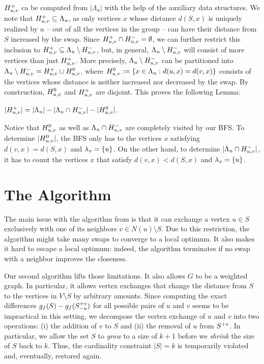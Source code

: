 $H_{u, v}^+$ ca be computed from $|\Lambda_u|$ with the help of the auxiliary data
structures. We note that $H_{u, v}^+ \subseteq \Lambda_u$, as only vertices $x$ whose
distance $d(S, x)$ is uniquely realized by $u$ -- out of all the vertices in
the group -- can have their distance from $S$ increased by the swap.
Since $H_{u, v}^+ \cap H_{u, v}^- = \emptyset$, we can further restrict this inclusion
to $H_{u, v}^+ \subseteq \Lambda_u \setminus H_{u, v}^-$, but, in general,
$\Lambda_u \setminus H_{u, v}^-$ will consist of more vertices than just $H_{u, v}^+$.
More precisely, $\Lambda_u \setminus H_{u, v}^-$ can be partitioned into
$\Lambda_u \setminus H_{u, v}^- = H_{u, v}^+ \cup H_{u, v}^0$, where
$\Huvo := \set{x \in \Lambda_u : d(u, x) = d(v, x)}$ consists of the vertices
whose distance is neither increased nor decreased by the swap. By construction,
$H_{u, v}^0$ and $H_{u, v}^+$ are disjoint. This proves the following Lemma:

\begin{lemma}
$|H_{u, v}^+| = |\Lambda_u| - |\Lambda_u \cap H_{u, v}^-| - |H_{u, v}^0|$.
\end{lemma}

Notice that $H_{u, v}^0$ as well as $\Lambda_u \cap H_{u, v}^-$ are completely
visited by our BFS. To determine $|H_{u, v}^0|$, the BFS only has to the vertices
$x$ satisfying $d(v, x) = d(S, x)$ and $\lambda_x = \set{u}$.
On the other hand, to determine $|\Lambda_u \cap H_{u, v}^-|$, it has to count the
vertices $x$ that satisfy $d(v, x) < d(S, x)$ and $\lambda_x = \set{u}$.


\section{The \growshrink Algorithm}
\label{sec:lsh-gc-grow-shrink}
%

The main issue with the \localswaps algorithm from 
is that it can exchange a vertex $u\in S$ exclusively with one of its neighbors
$v\in N(u) \setminus S$. Due to this restriction, the algorithm might take many
swaps to converge to a local optimum. It also makes it hard to escape a local
optimum: indeed, the algorithm terminates if no swap with a neighbor improves
the closeness.

Our second algorithm lifts those limitations. It also allows $G$ to be a
weighted graph. In particular, it allows vertex exchanges that change the
distance from $S$ to the vertices in $V\setminus S$ by arbitrary amounts. Since
computing the exact differences $g_f(S) - g_f(S_{-u}^{+v})$ for all possible
pairs of $u$ and $v$ seems to be impractical in this setting, we decompose the
vertex exchange of $u$ and $v$ into two operations: (i) the addition of $v$ to
$S$ and (ii) the removal of $u$ from $S^{+v}$. In particular, we allow the set $S$
to \emph{grow} to a size of $k + 1$ before we \emph{shrink} the size of $S$
back to $k$. Thus, the cardinality constraint $|S| = k$ is temporarily violated
and, eventually, restored again.

